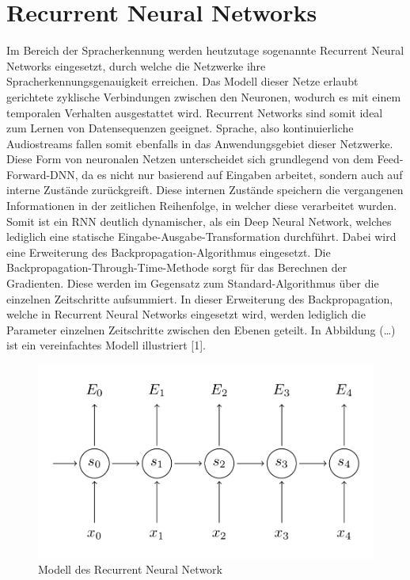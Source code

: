 \section{Recurrent Neural Networks}
Im Bereich der Spracherkennung werden heutzutage sogenannte Recurrent Neural Networks eingesetzt, durch welche die Netzwerke ihre Spracherkennungsgenauigkeit erreichen. Das Modell dieser Netze erlaubt gerichtete zyklische Verbindungen zwischen den Neuronen, wodurch es mit einem temporalen Verhalten ausgestattet wird. Recurrent Networks sind somit ideal zum Lernen von Datensequenzen geeignet. Sprache, also kontinuierliche Audiostreams fallen somit ebenfalls in das Anwendungsgebiet dieser Netzwerke. Diese Form von neuronalen Netzen unterscheidet sich grundlegend von dem Feed-Forward-DNN, da es nicht nur basierend auf Eingaben arbeitet, sondern auch auf interne Zustände zurückgreift. Diese internen Zustände speichern die vergangenen Informationen in der zeitlichen Reihenfolge, in welcher diese verarbeitet wurden. Somit ist ein RNN deutlich dynamischer, als ein Deep Neural Network, welches lediglich eine statische Eingabe-Ausgabe-Transformation durchführt. Dabei wird eine Erweiterung des Backpropagation-Algorithmus eingesetzt. Die Backpropagation-Through-Time-Methode sorgt für das Berechnen der Gradienten. Diese werden im Gegensatz zum Standard-Algorithmus über die einzelnen Zeitschritte aufsummiert. In dieser Erweiterung des Backpropagation, welche in Recurrent Neural Networks eingesetzt wird, werden lediglich die Parameter einzelnen Zeitschritte zwischen den Ebenen geteilt. In Abbildung (…) ist ein vereinfachtes Modell illustriert [1].

\begin{figure}[h!]
	\centering
	\includegraphics[width=0.5\linewidth]{images/rnn}
	\caption{Modell des Recurrent Neural Network  \cite{GonzalezDominguez.2015}} %
	\label{fig:topology}
\end{figure}

